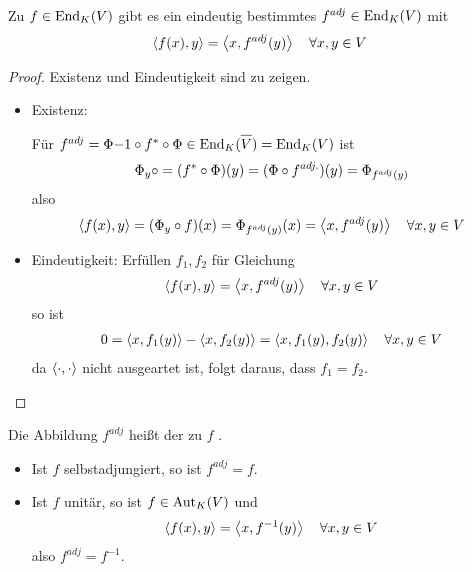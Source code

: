 \begin{proposition}
	Zu $f\in\operatorname{End}_K(V)$ gibt es ein eindeutig bestimmtes $f^{adj}\in\operatorname{End}_K(V)$ mit 
	\begin{align}
		\left\langle f(x),y\right\rangle=\left\langle x,f^{adj}(y)\right\rangle\quad\forall x,y\in V\notag
	\end{align}
\end{proposition}
\begin{proof}
	Existenz und Eindeutigkeit sind zu zeigen.
	\begin{itemize}
		\item Existenz:
		\begin{center}
		\end{center} %
		Für $f^{adj}=\Phi{-1}\circ f^*\circ \Phi\in \End_K(\overline{V})=\End_K(V)$ ist 
		\begin{align}
			\Phi_y\circ = (f^*\circ \Phi)(y)=(\Phi\circ f^{adj.})(y)=\Phi_{f^{adj}(y)}\notag
		\end{align}
		also
		\begin{align}
			\left\langle f(x),y\right\rangle=(\Phi_y\circ f)(x)=\Phi_{f^{adj}(y)}(x)=\left\langle x,f^{adj}(y)\right\rangle\quad\forall x,y\in V\notag
		\end{align}
		\item Eindeutigkeit: Erfüllen $f_1,f_2$ für Gleichung
		\begin{align}
			\left\langle f(x),y\right\rangle=\left\langle x,f^{adj}(y)\right\rangle\quad\forall x,y\in V\notag
		\end{align}
		so ist
		\begin{align}
			0=\left\langle x,f_1(y)\right\rangle-\left\langle x,f_2(y)\right\rangle=\left\langle x,f_1(y),f_2(y)\right\rangle\quad\forall x,y\in V\notag
		\end{align}
		da $\left\langle \cdot,\cdot\right\rangle$ nicht ausgeartet ist, folgt daraus, dass $f_1=f_2$.
	\end{itemize}
\end{proof}

\begin{definition}
	Die Abbildung $f^{adj}$ heißt der zu $f$ .
\end{definition}

\begin{example}
	\begin{itemize}
		\item Ist $f$ selbstadjungiert, so ist $f^{adj}=f$.
		\item Ist $f$ unitär, so ist $f\in\operatorname{Aut}_K(V)$ und 
		\begin{align}
		\left\langle f(x),y\right\rangle=\left\langle x,f^{-1}(y)\right\rangle\quad\forall x,y\in V\notag
		\end{align}
		also $f^{adj}=f^{-1}$.
	\end{itemize}
\end{example}

